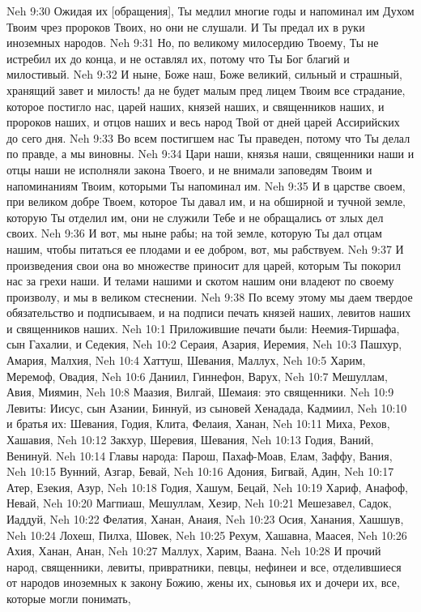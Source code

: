 Neh 9:30  Ожидая их [обращения], Ты медлил многие годы и напоминал им Духом Твоим чрез пророков Твоих, но они не слушали. И Ты предал их в руки иноземных народов.
Neh 9:31  Но, по великому милосердию Твоему, Ты не истребил их до конца, и не оставлял их, потому что Ты Бог благий и милостивый.
Neh 9:32  И ныне, Боже наш, Боже великий, сильный и страшный, хранящий завет и милость! да не будет малым пред лицем Твоим все страдание, которое постигло нас, царей наших, князей наших, и священников наших, и пророков наших, и отцов наших и весь народ Твой от дней царей Ассирийских до сего дня.
Neh 9:33  Во всем постигшем нас Ты праведен, потому что Ты делал по правде, а мы виновны.
Neh 9:34  Цари наши, князья наши, священники наши и отцы наши не исполняли закона Твоего, и не внимали заповедям Твоим и напоминаниям Твоим, которыми Ты напоминал им.
Neh 9:35  И в царстве своем, при великом добре Твоем, которое Ты давал им, и на обширной и тучной земле, которую Ты отделил им, они не служили Тебе и не обращались от злых дел своих.
Neh 9:36  И вот, мы ныне рабы; на той земле, которую Ты дал отцам нашим, чтобы питаться ее плодами и ее добром, вот, мы рабствуем.
Neh 9:37  И произведения свои она во множестве приносит для царей, которым Ты покорил нас за грехи наши. И телами нашими и скотом нашим они владеют по своему произволу, и мы в великом стеснении.
Neh 9:38  По всему этому мы даем твердое обязательство и подписываем, и на подписи печать князей наших, левитов наших и священников наших.
Neh 10:1  Приложившие печати были: Неемия-Тиршафа, сын Гахалии, и Седекия,
Neh 10:2  Сераия, Азария, Иеремия,
Neh 10:3  Пашхур, Амария, Малхия,
Neh 10:4  Хаттуш, Шевания, Маллух,
Neh 10:5  Харим, Меремоф, Овадия,
Neh 10:6  Даниил, Гиннефон, Варух,
Neh 10:7  Мешуллам, Авия, Миямин,
Neh 10:8  Маазия, Вилгай, Шемаия: это священники.
Neh 10:9  Левиты: Иисус, сын Азании, Биннуй, из сыновей Хенадада, Кадмиил,
Neh 10:10  и братья их: Шевания, Годия, Клита, Фелаия, Ханан,
Neh 10:11  Миха, Рехов, Хашавия,
Neh 10:12  Закхур, Шеревия, Шевания,
Neh 10:13  Годия, Ваний, Венинуй.
Neh 10:14  Главы народа: Парош, Пахаф-Моав, Елам, Заффу, Вания,
Neh 10:15  Вунний, Азгар, Бевай,
Neh 10:16  Адония, Бигвай, Адин,
Neh 10:17  Атер, Езекия, Азур,
Neh 10:18  Годия, Хашум, Бецай,
Neh 10:19  Хариф, Анафоф, Невай,
Neh 10:20  Магпиаш, Мешуллам, Хезир,
Neh 10:21  Мешезавел, Садок, Иаддуй,
Neh 10:22  Фелатия, Ханан, Анаия,
Neh 10:23  Осия, Ханания, Хашшув,
Neh 10:24  Лохеш, Пилха, Шовек,
Neh 10:25  Рехум, Хашавна, Маасея,
Neh 10:26  Ахия, Ханан, Анан,
Neh 10:27  Маллух, Харим, Ваана.
Neh 10:28  И прочий народ, священники, левиты, привратники, певцы, нефинеи и все, отделившиеся от народов иноземных к закону Божию, жены их, сыновья их и дочери их, все, которые могли понимать,
